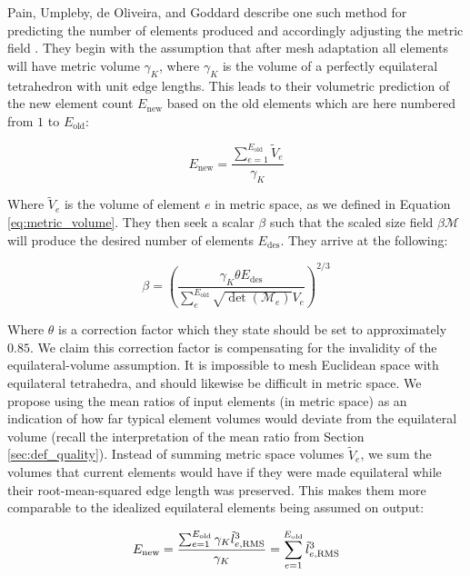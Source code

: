 Pain, Umpleby, de Oliveira, and Goddard describe one such method for
predicting the number of elements produced and accordingly adjusting
the metric field \cite{pain2001tetrahedral}.
They begin with the assumption that after mesh adaptation all elements
will have metric volume $\gamma_K$, where $\gamma_K$ is the volume of
a perfectly equilateral tetrahedron with unit edge lengths.
This leads to their volumetric prediction of the new element count
$E_\text{new}$ based on the old elements which are here
numbered from $1$ to $E_\text{old}$:

\begin{equation}
E_{\text{new}} = \frac{\sum_{e=1}^{E_{\text{old}}} \tilde{V}_e}{\gamma_K}
\end{equation}

Where $\tilde{V}_e$ is the volume of element $e$ in metric space,
as we defined in Equation \ref{eq:metric_volume}.
They then seek a scalar $\beta$ such that the scaled size field
$\beta\mathcal{M}$ will produce the desired number of elements
$E_\text{des}$.
They arrive at the following:

\begin{equation}
\beta = \left(\frac{\gamma_K\theta E_{\text{des}}}
{\sum_e^{E_{\text{old}}} \sqrt{\det(\mathcal{M}_e)}V_e}\right)^{2/3}
\end{equation}

Where $\theta$ is a correction factor which they state should
be set to approximately $0.85$.
We claim this correction factor is compensating for the invalidity
of the equilateral-volume assumption.
It is impossible to mesh Euclidean space with equilateral tetrahedra,
and should likewise be difficult in metric space.
We propose using the mean ratios of input elements (in metric space)
as an indication of how far typical element volumes would deviate
from the equilateral volume (recall the interpretation of the
mean ratio from Section \ref{sec:def_quality}).
Instead of summing metric space volumes $\tilde{V}_e$, we sum
the volumes that current elements would have if they were
made equilateral while their root-mean-squared edge length was preserved.
This makes them more comparable to the idealized equilateral
elements being assumed on output:

\begin{equation}
E_{\text{new}} = \frac{\sum_{e=1}^{E_{\text{old}}}
\gamma_K \tilde{l}_{e,\text{RMS}}^3}{\gamma_K}
 = \sum_{e=1}^{E_{\text{old}}} \tilde{l}_{e,\text{RMS}}^3 \\
\end{equation}

